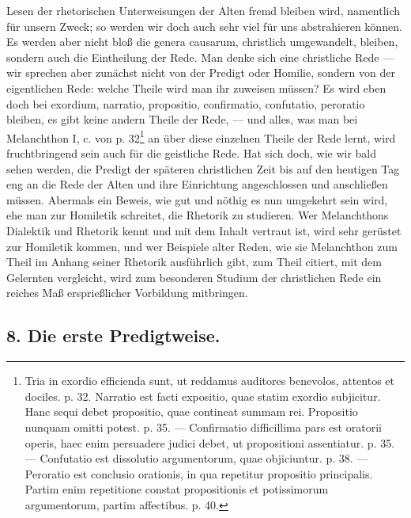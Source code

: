 Lesen der rhetorischen Unterweisungen der Alten fremd bleiben wird, namentlich für unsern Zweck; so werden wir doch auch sehr viel für uns abstrahieren können. Es werden aber nicht bloß die genera causarum, christlich umgewandelt, bleiben, sondern auch die Eintheilung der Rede. Man denke sich eine christliche Rede — wir sprechen aber zunächst nicht von der Predigt oder Homilie, sondern von der eigentlichen Rede: welche Theile wird man ihr zuweisen müssen? Es wird eben doch bei exordium, narratio, propositio, confirmatio, confutatio, peroratio bleiben, es gibt keine andern Theile der Rede, — und alles, was man bei Melanchthon I, c. von p. 32\footnote{Tria in exordio efficienda sunt, ut reddamus auditores benevolos, attentos et dociles. p. 32. Narratio est facti expositio, quae statim exordio subjicitur. Hanc sequi debet propositio, quae contineat summam rei. Propositio nunquam omitti potest. p. 35. — Confirmatio difficillima pars est oratorii operis, haec enim persuadere judici debet, ut propositioni assentiatur. p. 35. — Confutatio est dissolutio argumentorum, quae objiciuntur. p. 38. — Peroratio est conclusio orationis, in qua repetitur propositio principalis. Partim enim repetitione constat propositionis et potissimorum argumentorum, partim affectibus. p. 40.} an über diese einzelnen Theile der Rede lernt, wird
fruchtbringend sein auch für die geistliche Rede. Hat sich doch, wie wir bald sehen werden, die Predigt der späteren christlichen Zeit bis auf den heutigen Tag eng an die Rede der Alten und ihre Einrichtung angeschlossen und anschließen müssen. Abermals ein Beweis, wie gut und nöthig es nun umgekehrt sein wird, ehe man zur Homiletik schreitet, die Rhetorik zu studieren. Wer Melanchthons Dialektik und Rhetorik kennt und mit dem Inhalt vertraut ist, wird sehr gerüstet zur Homiletik kommen, und wer Beispiele alter Reden, wie sie Melanchthon zum Theil im Anhang seiner Rhetorik ausführlich gibt, zum Theil citiert, mit dem Gelernten vergleicht, wird zum besonderen Studium der christlichen Rede ein reiches Maß ersprießlicher Vorbildung mitbringen.

\subsection*{8. Die erste Predigtweise.}

